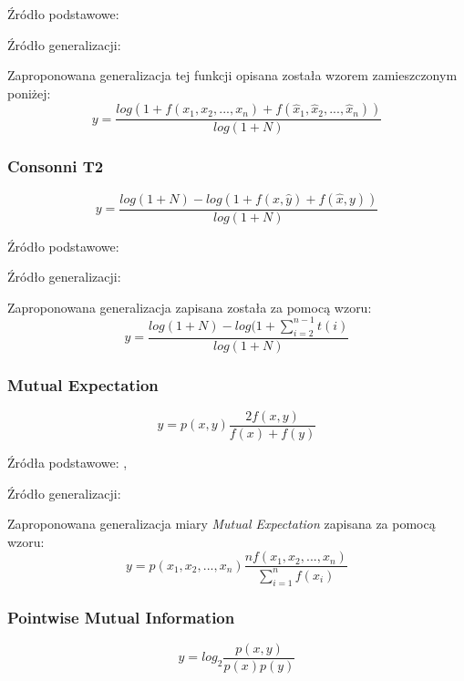 Źródło podstawowe: \cite[str. 4]{paradowski_beta}
\par
Źródło generalizacji: \cite{generalization_patterns}
\par
Zaproponowana generalizacja tej funkcji opisana została wzorem zamieszczonym poniżej:
$$ y = \frac{log(1 + f(x_{1}, x_{2}, ..., x_{n}) + f(\hat{x}_{1}, \hat{x}_{2}, ..., \hat{x}_{n}))}{log(1 + N)} $$

\subsubsection{Consonni T2}
$$ y = \frac{ log(1 + N) - log(1 + f(x, \hat{y}) + f(\hat{x}, y)) }{log(1 + N)} $$

Źródło podstawowe: \cite[str. 4]{paradowski_beta}
\par
Źródło generalizacji: \cite{generalization_patterns}
\par
Zaproponowana generalizacja zapisana została za pomocą wzoru:
$$ y = \frac{ log(1 + N) - log(1 + \sum_{i = 2}^{n - 1} t(i) }{log(1 + N)} $$

\subsubsection{Mutual Expectation}
$$ y = p(x, y) \frac{2f(x, y)}{f(x) + f(y)} $$

Źródła podstawowe: \cite[str. 18]{pecina_measures}, \cite{mutual_expectation}
\par
Źródło generalizacji: \cite{generalization_patterns}
\par
Zaproponowana generalizacja miary \emph{Mutual Expectation} zapisana za pomocą wzoru:
$$ y = p(x_{1}, x_{2}, ..., x_{n})\frac{nf(x_{1}, x_{2}, ..., x_{n})}{\sum_{i = 1}^{n} f(x_{i})} $$

\subsubsection{Pointwise Mutual Information}
$$ y = log_{2}\frac{p(x, y)}{p(x)p(y)} $$
 
